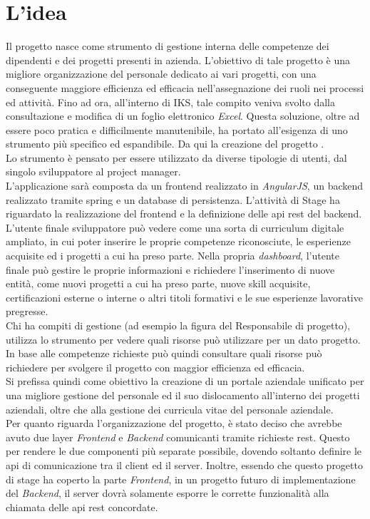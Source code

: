 
\section{L'idea}

Il progetto \myTitle{} nasce come strumento di gestione interna delle competenze dei dipendenti e dei progetti presenti in azienda. L'obiettivo di tale progetto è una migliore organizzazione del personale dedicato ai vari progetti, con una conseguente maggiore efficienza ed efficacia nell'assegnazione dei ruoli nei processi ed attività. Fino ad ora, all'interno di IKS, tale compito veniva svolto dalla consultazione e modifica di un foglio elettronico \emph{Excel}. Questa soluzione, oltre ad essere poco pratica e difficilmente manutenibile, ha portato all'esigenza di uno strumento più specifico ed espandibile. Da qui la creazione del progetto \myTitle{}.\\
Lo strumento \myTitle{} è pensato per essere utilizzato da diverse tipologie di utenti, dal singolo sviluppatore al project manager.\\
L'applicazione sarà composta da un \gls{frontend} realizzato in \emph{AngularJS}, un \gls{backend} realizzato tramite \gls{spring} e un database di persistenza. L'attività di Stage ha riguardato la realizzazione del frontend e la definizione delle \gls{api} \gls{rest} del backend.\\
L'utente finale sviluppatore può vedere \myTitle{} come una sorta di curriculum digitale ampliato, in cui poter inserire le proprie competenze riconosciute, le esperienze acquisite ed i progetti a cui ha preso parte. Nella propria \emph{dashboard}, l'utente finale può gestire le proprie informazioni e richiedere l'inserimento di nuove entità, come nuovi progetti a cui ha preso parte, nuove skill acquisite, certificazioni esterne o interne o altri titoli formativi e le sue esperienze lavorative pregresse.\\ 
Chi ha compiti di gestione (ad esempio la figura del Responsabile di progetto), utilizza lo strumento per vedere quali risorse può utilizzare per un dato progetto. In base alle competenze richieste può quindi consultare quali risorse può richiedere per svolgere il progetto con maggior efficienza ed efficacia.\\ 
Si prefissa quindi come obiettivo la creazione di un portale aziendale unificato per una migliore gestione del personale ed il suo dislocamento all’interno dei progetti aziendali, oltre che alla gestione dei curricula vitae del personale aziendale.\\
Per quanto riguarda l'organizzazione del progetto, è stato deciso che \myTitle{} avrebbe avuto due layer \emph{Frontend} e \emph{Backend} comunicanti tramite richieste \gls{rest}. Questo per rendere le due componenti più separate possibile, dovendo soltanto definire le \gls{api} di comunicazione tra il client ed il server. Inoltre, essendo che questo progetto di stage ha coperto la parte \emph{Frontend}, in un progetto futuro di implementazione del \emph{Backend}, il server dovrà solamente esporre le corrette funzionalità alla chiamata delle \gls{api} \gls{rest} concordate.




